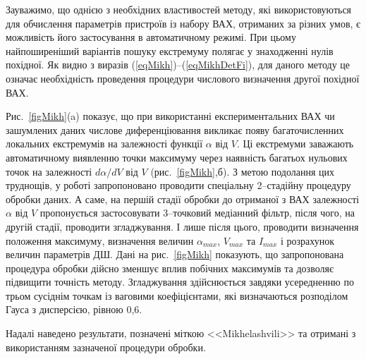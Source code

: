 Зауважимо, що однією з необхідних властивостей методу, які використовуються для обчислення параметрів пристроїв із набору ВАХ, отриманих за різних умов, є можливість його застосування в автоматичному режимі.
При цьому найпоширеніший варіантів пошуку екстремуму полягає у знаходженні нулів похідної.
Як видно з виразів (\ref{eqMikh})--(\ref{eqMikhDetFi}), для даного методу це означає необхідність проведення процедури числового визначення другої похідної ВАХ.


Рис.~\ref{figMikh}(a) показує, що при використанні експериментальних ВАХ чи зашумлених даних числове диференціювання викликає появу багаточисленних локальних екстремумів на залежності функції $\alpha$ від $V$.
Ці екстремуми заважають автоматичному виявленню точки максимуму через наявність багатьох нульових точок на залежності $d\alpha/dV$ від $V$ (рис.~\ref{figMikh},б).
З метою подолання цих труднощів, у роботі запропоновано проводити спеціальну 2--стадійну процедуру обробки даних.
А саме, на першій стадії обробки до отриманої з ВАХ залежності $\alpha$ від $V$ пропонується застосовувати 3--точковий медіанний фільтр, після чого, на другій стадії, проводити згладжування.
І лише після цього, проводити визначення положення максимуму, визначення величин $\alpha_{max}$, $V_{max}$  та $I_{max}$ і розрахунок величин параметрів ДШ.
Дані на рис.~\ref{figMikh} показують, що запропонована процедура обробки дійсно зменшує вплив побічних максимумів та дозволяє підвищити точність методу.
Згладжування здійснюється завдяки усередненню по трьом сусіднім точкам із ваговими коефіцієнтами, які визначаються розподілом Гауса з дисперсією, рівною 0,6.

Надалі наведено результати, позначені міткою <<Mikhelashvili>> та отримані з використанням зазначеної процедури обробки.



